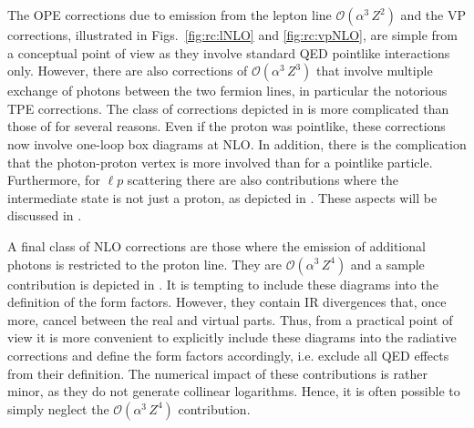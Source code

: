 The OPE corrections due to emission from the lepton line
$\mathcal{O}(\alpha^3\,Z^2)$ and the VP corrections, illustrated in Figs.~\ref{fig:rc:lNLO} and
\ref{fig:rc:vpNLO}, are simple from a conceptual
point of view as they involve standard QED pointlike interactions
only. However, there are also corrections of $\mathcal{O}(\alpha^3\,Z^3)$
that involve multiple exchange of photons between the two fermion
 lines, in particular the notorious TPE
corrections. The class of corrections depicted in  is
more complicated than those of  for several
reasons. Even if the proton was pointlike, these corrections now
involve one-loop box diagrams at NLO. In addition, there is the complication that the
photon-proton vertex is more involved than for a pointlike
particle. Furthermore, for $\ell p$ scattering there are also
contributions where the intermediate state is not just a proton, as
depicted in . These aspects will be discussed in
.



A final class of NLO corrections are those where the emission of
additional photons is restricted to the proton line. They are
$\mathcal{O}(\alpha^3\,Z^4)$ and a sample contribution is depicted in
. It is tempting to include these diagrams into
the definition of the form factors. However, they contain IR
divergences that, once more, cancel between the real and virtual
parts. Thus, from a practical point of view it is more convenient to
explicitly include these diagrams into the radiative corrections and define the form factors
accordingly, i.e. exclude all QED effects from their definition. 
The numerical impact of these contributions is rather minor, as they
do not generate collinear logarithms. Hence, it is often possible to
simply neglect the $\mathcal{O}(\alpha^3\,Z^4)$ contribution. 





